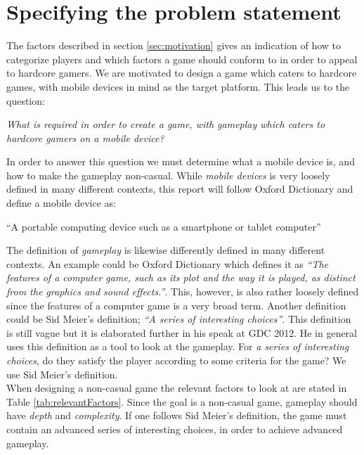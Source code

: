 \section{Specifying the problem statement}
\label{sec:specifyingtheproblemstatemen}

The factors described in section \ref{sec:motivation} gives an indication of
how to categorize players and which factors a game should conform to in order
to appeal to hardcore gamers.
We are motivated to design a game which caters to hardcore games, with mobile devices in mind as the target platform.
This leads us to the question:
\begin{center}
\textit{What is required in order to create a game, with gameplay which caters to hardcore gamers on a mobile device?}
\end{center}

In order to answer this question we must determine what a mobile device is, and how to make the gameplay non-casual.
While \textit{mobile devices} is very loosely defined in many different contexts, this report will follow Oxford Dictionary and define a mobile device as:
\begin{center}
``A portable computing device such as a smartphone or tablet computer''\cite{mobileOx}
\end{center}

The definition of \textit{gameplay} is likewise differently defined in many different contexts. 
An example could be Oxford Dictionary which defines it as \textit{``The features of a computer game, such as its plot and the way it is played, as distinct from the graphics and sound effects.''}\cite{gameplayOx}. This, however, is also rather loosely defined since the features of a computer game is a very broad term.
Another definition could be Sid Meier's definition; \textit{``A series of interesting choices''}\cite{GDC2012}.
This definition is still vague but it is elaborated further in his speak at GDC 2012.\cite{GDC2012}
He in general uses this definition as a tool to look at the gameplay.
For \textit{a series of interesting choices}, do they satisfy the player according to some criteria for the game?
We use Sid Meier's definition.\\

When designing a non-casual game the relevant factors to look at are stated in Table \ref{tab:relevantFactors}.
Since the goal is a non-casual game, gameplay should have \textit{depth} and \textit{complexity}.
If one follows Sid Meier's definition, the game must contain an advanced series of interesting choices, in order to achieve advanced gameplay.

